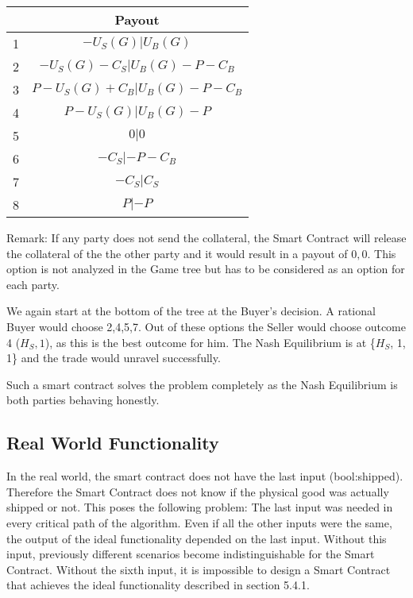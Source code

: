 \documentclass{cacthesis}
\begin{document}
\begin{center}
\begin{tabular}{ |c|c| }
\hline
& Payout  \\
\hline
\hline
1& $-U_S(G) | U_B(G)$\\
\hline
2& $-U_S(G) - C_S| U_B(G)-P - C_B  $\\
\hline
3&$P-U_S(G) + C_B | U_B(G)-P - C_B$ \\
\hline
4& $P-U_S(G)| U_B(G)-P$\\
\hline
5& $0|0$\\
\hline 
6& $-C_S |-P - C_B$\\
\hline
7& $- C_S| C_S$\\
\hline
8& $P| -P$\\
\hline
\end{tabular}
\end{center}

Remark: If any party does not send the collateral, the Smart Contract will release the collateral of the the other party and it would result in a payout of $0,0$. This option is not analyzed in the Game tree but has to be considered as an option for each party.\newline

We again start at the bottom of the tree at the Buyer's decision. A rational Buyer would choose 2,4,5,7. Out of these options the Seller would choose outcome 4 ($H_S,1$), as this is the best outcome for him.\newline
The Nash Equilibrium is at \{$H_S$, 1, 1\} and the trade would unravel successfully.\newline

Such a smart contract solves the problem completely as the Nash Equilibrium is both parties behaving honestly.
\subsection{Real World Functionality}
In the real world, the smart contract does not have the last input (bool:shipped). Therefore the Smart Contract does not know if the physical good was actually shipped or not. \newline
This poses the following problem: The last input was needed in every critical path of the algorithm. Even if all the other inputs were the same, the output of the ideal functionality depended on the last input. Without this input, previously different scenarios become indistinguishable for the Smart Contract. Without the sixth input, it is impossible to design a Smart Contract that achieves the ideal functionality described in section 5.4.1.
\end{document}
